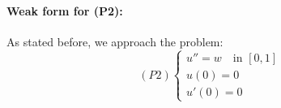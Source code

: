 \documentclass{article}
\begin{document}

\paragraph{Weak form for (P2):}
\noindent As stated before, we approach the problem:\\
\[ (P2) \left\{
\begin{array}{rcl}
u''=w \quad \text{in } [0,1]\\
u(0)=0\\
u'(0)=0
\end{array}
\right.\]
\end{document}
